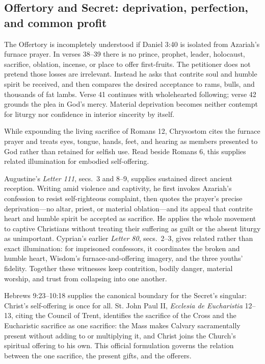 \sectionguard
\subsection*{Offertory and Secret: deprivation, perfection, and common profit\enspace{}}

The Offertory is incompletely understood if Daniel 3:40 is isolated from Azariah's furnace prayer. In verses 38--39 there is no prince, prophet, leader, holocaust, sacrifice, oblation, incense, or place to offer first-fruits. The petitioner does not pretend those losses are irrelevant. Instead he asks that contrite soul and humble spirit be received, and then compares the desired acceptance to rams, bulls, and thousands of fat lambs. Verse 41 continues with wholehearted following; verse 42 grounds the plea in God's mercy. Material deprivation becomes neither contempt for liturgy nor confidence in interior sincerity by itself.

While expounding the living sacrifice of Romans 12, Chrysostom cites the furnace prayer and treats eyes, tongue, hands, feet, and hearing as members presented to God rather than retained for selfish use. Read beside Romans 6, this supplies related illumination for embodied self-offering.

Augustine's \emph{Letter 111}, secs.~3 and 8--9, supplies sustained direct ancient reception. Writing amid violence and captivity, he first invokes Azariah's confession to resist self-righteous complaint, then quotes the prayer's precise deprivation---no altar, priest, or material oblation---and its appeal that contrite heart and humble spirit be accepted as sacrifice. He applies the whole movement to captive Christians without treating their suffering as guilt or the absent liturgy as unimportant. Cyprian's earlier \emph{Letter 80}, secs.~2--3, gives related rather than exact illumination: for imprisoned confessors, it coordinates the broken and humble heart, Wisdom's furnace-and-offering imagery, and the three youths' fidelity. Together these witnesses keep contrition, bodily danger, material worship, and trust from collapsing into one another.

Hebrews 9:23--10:18 supplies the canonical boundary for the Secret's singular: Christ's self-offering is once for all. St. John Paul II, \emph{Ecclesia de Eucharistia} 12--13, citing the Council of Trent, identifies the sacrifice of the Cross and the Eucharistic sacrifice as one sacrifice: the Mass makes Calvary sacramentally present without adding to or multiplying it, and Christ joins the Church's spiritual offering to his own. This official formulation governs the relation between the one sacrifice, the present gifts, and the offerers.

